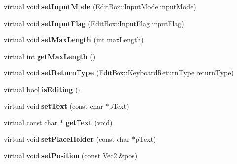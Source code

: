 \begin{DoxyCompactItemize}
virtual void {\bfseries set\+Input\+Mode} (\hyperlink{classui_1_1EditBox_a7a1bfe8f3ba218bedfcf5451ec3ce01a}{Edit\+Box\+::\+Input\+Mode} input\+Mode)
\item 
\mbox{\label{classui_1_1EditBoxImplTizen_a79086865ae225c59684504bf29a5147e}} 
virtual void {\bfseries set\+Input\+Flag} (\hyperlink{classui_1_1EditBox_af02f13ee9fba51d59bb3111e200848c8}{Edit\+Box\+::\+Input\+Flag} input\+Flag)
\item 
\mbox{\label{classui_1_1EditBoxImplTizen_a24d64096f294b3c0c9c70cd426ba911d}} 
virtual void {\bfseries set\+Max\+Length} (int max\+Length)
\item 
\mbox{\label{classui_1_1EditBoxImplTizen_aeef8d26eba3bd2ea75c7375b8ad7fa8b}} 
virtual int {\bfseries get\+Max\+Length} ()
\item 
\mbox{\label{classui_1_1EditBoxImplTizen_aee6850a4138fd0aed192bcf7624eb4c1}} 
virtual void {\bfseries set\+Return\+Type} (\hyperlink{classui_1_1EditBox_a1e1285b6f742975b26bdeb8108ca6e51}{Edit\+Box\+::\+Keyboard\+Return\+Type} return\+Type)
\item 
\mbox{\label{classui_1_1EditBoxImplTizen_ad8158dac1c2145a5273c6b29521324b0}} 
virtual bool {\bfseries is\+Editing} ()
\item 
\mbox{\label{classui_1_1EditBoxImplTizen_a6a04385b5382df48253af1f874e59e0f}} 
virtual void {\bfseries set\+Text} (const char $\ast$p\+Text)
\item 
\mbox{\label{classui_1_1EditBoxImplTizen_a0aa60e76fde9f570614d3abccf3a6da9}} 
virtual const char $\ast$ {\bfseries get\+Text} (void)
\item 
\mbox{\label{classui_1_1EditBoxImplTizen_ab091d666002004fd617b474089097410}} 
virtual void {\bfseries set\+Place\+Holder} (const char $\ast$p\+Text)
\item 
\mbox{\label{classui_1_1EditBoxImplTizen_af2fafc1dbc4ec6a622915ee5e8ac3d9e}} 
virtual void {\bfseries set\+Position} (const \hyperlink{classVec2}{Vec2} \&pos)

\end{DoxyCompactItemize}

